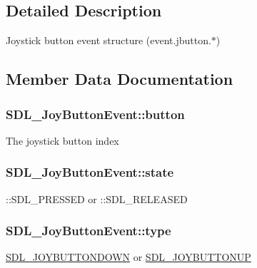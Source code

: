 \subsection{Detailed Description}
Joystick button event structure (event.\+jbutton.$\ast$) 

\subsection{Member Data Documentation}
\hypertarget{struct_s_d_l___joy_button_event_a73ebe4261cf80564052af9c1af737a4d}{}
\subsubsection[{button}]{ S\+D\+L\+\_\+\+Joy\+Button\+Event\+::button}\label{struct_s_d_l___joy_button_event_a73ebe4261cf80564052af9c1af737a4d}
The joystick button index \hypertarget{struct_s_d_l___joy_button_event_ad3b6f8d9aa2c5e694f664b97d12bcd2b}{}
\subsubsection[{state}]{ S\+D\+L\+\_\+\+Joy\+Button\+Event\+::state}\label{struct_s_d_l___joy_button_event_ad3b6f8d9aa2c5e694f664b97d12bcd2b}
\+::\+S\+D\+L\+\_\+\+P\+R\+E\+S\+S\+E\+D or \+::\+S\+D\+L\+\_\+\+R\+E\+L\+E\+A\+S\+E\+D \hypertarget{struct_s_d_l___joy_button_event_a8f3312a046d37fa2884b93f69c4cb655}{}
\subsubsection[{type}]{ S\+D\+L\+\_\+\+Joy\+Button\+Event\+::type}\label{struct_s_d_l___joy_button_event_a8f3312a046d37fa2884b93f69c4cb655}
\hyperlink{_s_d_l__events_8h_a3b589e89be6b35c02e0dd34a55f3fccaa386ac978bc145a45883fe0adab70710b}{S\+D\+L\+\_\+\+J\+O\+Y\+B\+U\+T\+T\+O\+N\+D\+O\+W\+N} or \hyperlink{_s_d_l__events_8h_a3b589e89be6b35c02e0dd34a55f3fccaa76f91c81110f012e3a47cbbc0449e3c3}{S\+D\+L\+\_\+\+J\+O\+Y\+B\+U\+T\+T\+O\+N\+U\+P} \hypertarget{struct_s_d_l___joy_button_event_a1679049adad7242b28420948fdc79044}{}
